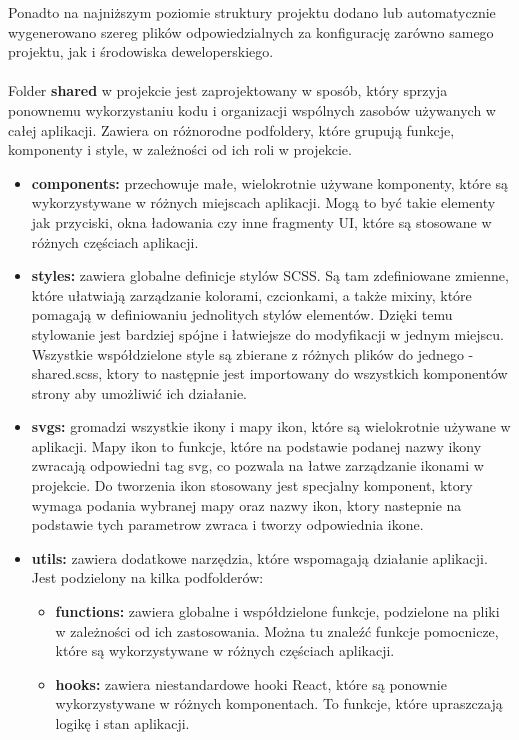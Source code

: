 \documentclass[12pt,a4paper]{article}
\begin{document}
\newpage

\noindent
Ponadto na najniższym poziomie struktury projektu dodano lub automatycznie wygenerowano szereg plików odpowiedzialnych za konfigurację zarówno samego projektu, jak i środowiska deweloperskiego.
\\\\
Folder \textbf{shared} w projekcie jest zaprojektowany w sposób, który sprzyja ponownemu wykorzystaniu kodu i organizacji wspólnych zasobów używanych w całej aplikacji. Zawiera on różnorodne podfoldery, które grupują funkcje, komponenty i style, w zależności od ich roli w projekcie.

\begin{itemize}
    \item \textbf{components:} przechowuje małe, wielokrotnie używane komponenty, które są wykorzystywane w różnych miejscach aplikacji. Mogą to być takie elementy jak  przyciski, okna ładowania czy inne fragmenty UI, które są stosowane w różnych częściach aplikacji.
    \item \textbf{styles:} zawiera globalne definicje stylów SCSS. Są tam zdefiniowane zmienne, które ułatwiają zarządzanie kolorami, czcionkami, a także mixiny, które pomagają w definiowaniu jednolitych stylów elementów. Dzięki temu stylowanie jest bardziej spójne i łatwiejsze do modyfikacji w jednym miejscu. Wszystkie współdzielone style są zbierane z różnych plików do jednego - shared.scss, ktory to następnie jest importowany do wszystkich komponentów strony aby umożliwić ich działanie.
    \item \textbf{svgs:} gromadzi wszystkie ikony i mapy ikon, które są wielokrotnie używane w aplikacji. Mapy ikon to funkcje, które na podstawie podanej nazwy ikony zwracają odpowiedni tag svg, co pozwala na łatwe zarządzanie ikonami w projekcie. Do tworzenia ikon stosowany jest specjalny komponent, ktory wymaga podania wybranej mapy oraz nazwy ikon, ktory nastepnie na podstawie tych parametrow zwraca i tworzy odpowiednia ikone.
    \item \textbf{utils:} zawiera dodatkowe narzędzia, które wspomagają działanie aplikacji. Jest podzielony na kilka podfolderów:
    \begin{itemize}
        \item \textbf{functions:} zawiera globalne i współdzielone funkcje, podzielone na pliki w zależności od ich zastosowania. Można tu znaleźć funkcje pomocnicze, które są wykorzystywane w różnych częściach aplikacji.
        \item \textbf{hooks:} zawiera niestandardowe hooki React, które są ponownie wykorzystywane w różnych komponentach. To funkcje, które upraszczają logikę i stan aplikacji.

\end{itemize}
\end{itemize}
\end{document}
